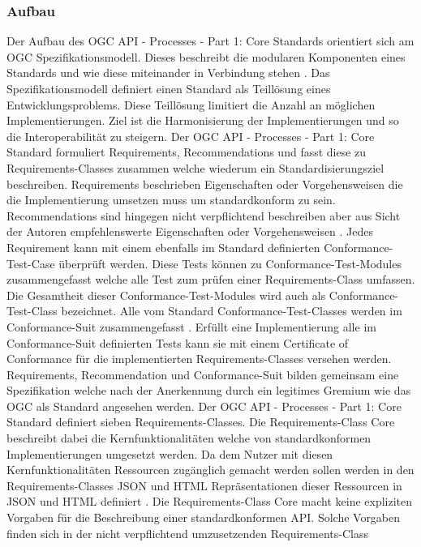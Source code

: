 \subsubsection{Aufbau}
Der Aufbau des OGC API - Processes - Part 1: Core Standards orientiert sich am OGC Spezifikationsmodell. Dieses beschreibt die modularen Komponenten eines Standards und 
wie diese miteinander in Verbindung stehen \cite{ogc_specification_model}. Das Spezifikationsmodell definiert einen Standard als Teillösung eines Entwicklungsproblems.
Diese Teillösung limitiert die Anzahl an möglichen Implementierungen. Ziel ist die Harmonisierung der Implementierungen und so die Interoperabilität zu steigern.
Der OGC API - Processes - Part 1: Core Standard formuliert Requirements, Recommendations und fasst diese zu Requirements-Classes zusammen welche wiederum 
ein Standardisierungsziel beschreiben. Requirements beschrieben Eigenschaften oder Vorgehensweisen die die Implementierung umsetzen muss um standardkonform zu sein. 
Recommendations sind hingegen nicht verpflichtend beschreiben aber aus Sicht der Autoren empfehlenswerte Eigenschaften oder Vorgehensweisen \cite{ogc_specification_model}. 
Jedes Requirement kann mit einem ebenfalls im Standard definierten Conformance-Test-Case überprüft werden. Diese Tests können zu Conformance-Test-Modules zusammengefasst 
welche alle Test zum prüfen einer Requirements-Class umfassen. Die Gesamtheit dieser Conformance-Test-Modules wird auch als Conformance-Test-Class bezeichnet. Alle vom 
Standard Conformance-Test-Classes werden im Conformance-Suit zusammengefasst \cite{ogc_specification_model}. Erfüllt eine Implementierung alle im Conformance-Suit definierten 
Tests kann sie mit einem Certificate of Conformance für die implementierten Requirements-Classes versehen werden. Requirements, Recommendation und Conformance-Suit bilden 
gemeinsam eine Spezifikation welche nach der Anerkennung durch ein legitimes Gremium wie das OGC als Standard angesehen werden.
Der OGC API - Processes - Part 1: Core Standard definiert sieben Requirements-Classes. Die Requirements-Class Core beschreibt dabei die Kernfunktionalitäten welche 
von standardkonformen Implementierungen umgesetzt werden. Da dem Nutzer mit diesen Kernfunktionalitäten Ressourcen zugänglich gemacht werden sollen werden in den 
Requirements-Classes JSON und HTML Repräsentationen dieser Ressourcen in JSON und HTML definiert \cite{ogc_api_processes_core}. Die Requirements-Class Core macht keine
expliziten Vorgaben für die Beschreibung einer standardkonformen API. Solche Vorgaben finden sich in der nicht verpflichtend umzusetzenden Requirements-Class

